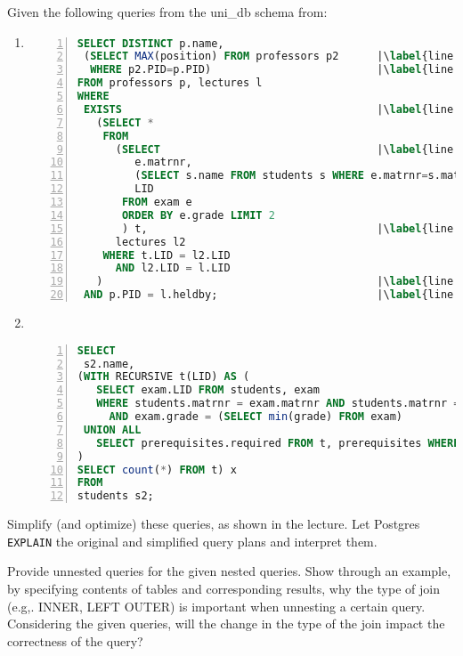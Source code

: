 
Given the following queries from the uni\_db schema from:

\begin{enumerate}
  \item \begin{lstlisting}[language=sql,numbers=left, stepnumber=1, numberstyle = \tiny,escapechar=|]
SELECT DISTINCT p.name,
 (SELECT MAX(position) FROM professors p2      |\label{line:max_prof}|
  WHERE p2.PID=p.PID)                          |\label{line:max_prof_2}|
FROM professors p, lectures l
WHERE 
 EXISTS                                        |\label{line:start_exist}|
   (SELECT *
    FROM
      (SELECT                                  |\label{line:start_simplify}|
         e.matrnr,
         (SELECT s.name FROM students s WHERE e.matrnr=s.matrnr),
         LID
       FROM exam e
       ORDER BY e.grade LIMIT 2
       ) t,                                    |\label{line:end_simplify}|
      lectures l2
    WHERE t.LID = l2.LID
      AND l2.LID = l.LID
   )                                           |\label{line:end_exist}|
 AND p.PID = l.heldby;                         |\label{line:outer_p_o_joinpred}| \end{lstlisting}

  \item \
        \begin{lstlisting}[language=sql,numbers=left, stepnumber=1, numberstyle = \tiny]
SELECT
 s2.name,
(WITH RECURSIVE t(LID) AS (
   SELECT exam.LID FROM students, exam
   WHERE students.matrnr = exam.matrnr AND students.matrnr = s2.matrnr
     AND exam.grade = (SELECT min(grade) FROM exam)
 UNION ALL
   SELECT prerequisites.required FROM t, prerequisites WHERE t.LID = prerequisites.lecture
)
SELECT count(*) FROM t) x
FROM
students s2;\end{lstlisting}
\end{enumerate}

Simplify (and optimize) these queries, as shown in the lecture.
Let Postgres \verb+EXPLAIN+ the original and simplified query plans and interpret them.

\newpage


Provide unnested queries for the given nested queries. Show through an example, by specifying contents of tables and corresponding results, why the type of join (e.g,. INNER, LEFT OUTER) is important when unnesting a certain query. Considering the given queries, will the change in the type of the join impact the correctness of the query?

